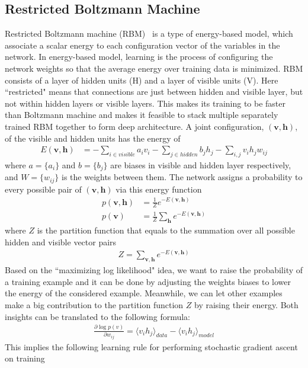\subsection{Restricted Boltzmann Machine}
Restricted Boltzmann machine (RBM)~\cite{RBMTechReport} is a type of energy-based model,
which associate a scalar energy to each configuration vector of the variables in the network.
In energy-based model, learning is the process of configuring the network weights so that
the average energy over training data is minimized.
RBM consists of a layer of hidden units (H) and a layer of visible units (V).
Here ``restricted" means that connections are just between hidden and visible layer,
but not within hidden layers or visible layers.
This makes its training to be faster than Boltzmann machine and makes it feasible to
stack multiple separately trained RBM together to form deep architecture.
A joint configuration, $(\mathbf{v, h})$, of the visible and hidden units has the energy of
\begin{align}
    E(\mathbf{v, h}) &= -\sum_{i\in visible}a_i v_i - \sum_{j\in hidden}b_j h_j - \sum_{i, j}v_i h_j w_{ij}
\end{align}
where $a=\{a_i\}$ and $b=\{b_j\}$ are biases in visible and hidden layer respectively,
and $W=\{w_{ij}\}$ is the weights between them.
The network assigns a probability to every possible pair of $(\mathbf{v, h})$ via this energy
function
\begin{align}
    p(\mathbf{v, h}) &= \frac{1}{Z} e^{-E(\mathbf{v, h})} \\
    p(\mathbf{v}) &= \frac{1}{Z} \sum_{\mathbf{h}} e^{-E(\mathbf{v, h})}
\end{align}
where $Z$ is the partition function that equals to the summation over all possible hidden
and visible vector pairs
\begin{align}
    Z = \sum_{\mathbf{v,h}} e^{-E(\mathbf{v, h})}
\end{align}
Based on the ``maximizing log likelihood" idea,
we want to raise the probability of a training example and it can be done by
adjusting the weights biases to lower the energy of the considered example.
Meanwhile, we can let other examples make a big contribution to the partition function $Z$
by raising their energy.
Both insights can be translated to the following formula:
\begin{align}
    \frac{\partial \log p(v)}{\partial w_{ij}} = \langle v_i h_j \rangle_{data} - \langle v_i h_j \rangle_{model} 
\end{align}
This implies the following learning rule for performing stochastic gradient ascent on training
